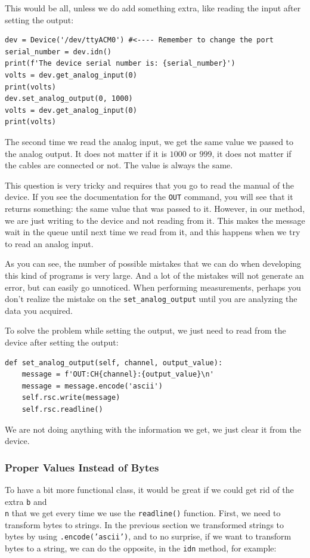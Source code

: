 This would be all, unless we do add something extra, like reading the input after setting the output:

\begin{verbatim}
dev = Device('/dev/ttyACM0') #<---- Remember to change the port
serial_number = dev.idn()
print(f'The device serial number is: {serial_number}')
volts = dev.get_analog_input(0)
print(volts)
dev.set_analog_output(0, 1000)
volts = dev.get_analog_input(0)
print(volts)
\end{verbatim}

The second time we read the analog input, we get the same value we passed to the analog output. It does not matter if it is $1000$ or $999$, it does not matter if the cables are connected or not. The value is always the same.


This question is very tricky and requires that you go to read the manual of the device. If you see the documentation for the \texttt{OUT} command, you will see that it returns something: the same value that was passed to it. However, in our method, we are just writing to the device and not reading from it. This makes the message wait in the queue until next time we read from it, and this happens when we try to read an analog input.

As you can see, the number of possible mistakes that we can do when developing this kind of programs is very large. And a lot of the mistakes will not generate an error, but can easily go unnoticed. When performing measurements, perhaps you don't realize the mistake on the \texttt{set\_analog\_output} until you are analyzing the data you acquired.

To solve the problem while setting the output, we just need to read from the device after setting the output:

\begin{verbatim}
def set_analog_output(self, channel, output_value):
    message = f'OUT:CH{channel}:{output_value}\n'
    message = message.encode('ascii')
    self.rsc.write(message)
    self.rsc.readline()
\end{verbatim}

We are not doing anything with the information we get, we just clear it from the device.

\subsubsection{Proper Values Instead of Bytes}
To have a bit more functional class, it would be great if we could get rid of the extra \texttt{b} and \texttt{\\n} that we get every time we use the \texttt{readline()} function. First, we need to transform bytes to strings. In the previous section we transformed strings to bytes by using \texttt{.encode('ascii')}, and to no surprise, if we want to transform bytes to a string, we can do the opposite, in the \texttt{idn} method, for example:

